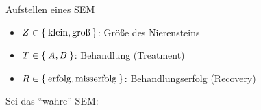 \begin{frame}{Aufstellen eines SEM}
    \begin{itemize}[label={}]
        \item $Z \in \Set{\text{klein}, \text{groß}}$: Größe des Nierensteins
        \item $T \in \Set{A, B}$: Behandlung (Treatment)
        \item $R \in \Set{\text{erfolg}, \text{misserfolg}}$: Behandlungserfolg (Recovery)
    \end{itemize}

    Sei das \enquote{wahre} SEM:
    \begin{figure}[!h]
        \centering
    \end{figure}
\end{frame}

